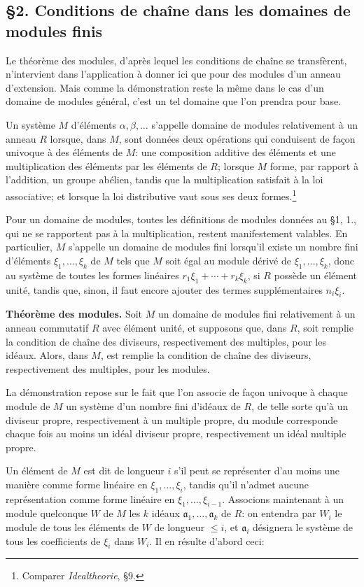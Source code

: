 \subsection*{\S{}2. Conditions de chaîne dans les domaines de modules finis}

Le théorème des modules, d'après lequel les conditions de chaîne se transfèrent, n'intervient dans l'application à donner ici que pour des modules d'un anneau d'extension. Mais comme la démonstration reste la même dans le cas d'un domaine de modules général, c'est un tel domaine que l'on prendra pour base.

Un système $M$ d'éléments $\alpha,\beta,\ldots$ s'appelle domaine de modules relativement à un anneau $R$ lorsque, dans $M$, sont données deux opérations qui conduisent de façon univoque à des éléments de $M$: une composition additive des éléments et une multiplication des éléments par les éléments de $R$; lorsque $M$ forme, par rapport à l'addition, un groupe abélien, tandis que la multiplication satisfait à la loi associative; et lorsque la loi distributive vaut sous ses deux formes.\footnote{Comparer \emph{Idealtheorie}, \S{}9.}

Pour un domaine de modules, toutes les définitions de modules données au \S{}1, 1., qui ne se rapportent pas à la multiplication, restent manifestement valables. En particulier, $M$ s'appelle un domaine de modules fini lorsqu'il existe un nombre fini d'éléments $\xi_1,\ldots,\xi_k$ de $M$ tels que $M$ soit égal au module dérivé de $\xi_1,\ldots,\xi_k$, donc au système de toutes les formes linéaires $r_1\xi_1+\cdots+r_k\xi_k$, si $R$ possède un élément unité, tandis que, sinon, il faut encore ajouter des termes supplémentaires $n_i\xi_i$.

\medskip
\noindent\textbf{Théorème des modules.} Soit $M$ un domaine de modules fini relativement à un anneau commutatif $R$ avec élément unité, et supposons que, dans $R$, soit remplie la condition de chaîne des diviseurs, respectivement des multiples, pour les idéaux. Alors, dans $M$, est remplie la condition de chaîne des diviseurs, respectivement des multiples, pour les modules.

La démonstration repose sur le fait que l'on associe de façon univoque à chaque module de $M$ un système d'un nombre fini d'idéaux de $R$, de telle sorte qu'à un diviseur propre, respectivement à un multiple propre, du module corresponde chaque fois au moins un idéal diviseur propre, respectivement un idéal multiple propre.

Un élément de $M$ est dit de longueur $i$ s'il peut se représenter d'au moins une manière comme forme linéaire en $\xi_1,\ldots,\xi_i$, tandis qu'il n'admet aucune représentation comme forme linéaire en $\xi_1,\ldots,\xi_{i-1}$. Associons maintenant à un module quelconque $W$ de $M$ les $k$ idéaux $\mathfrak a_1,\ldots,\mathfrak a_k$ de $R$: on entendra par $W_i$ le module de tous les éléments de $W$ de longueur $\le i$, et $\mathfrak a_i$ désignera le système de tous les coefficients de $\xi_i$ dans $W_i$. Il en résulte d'abord ceci:

